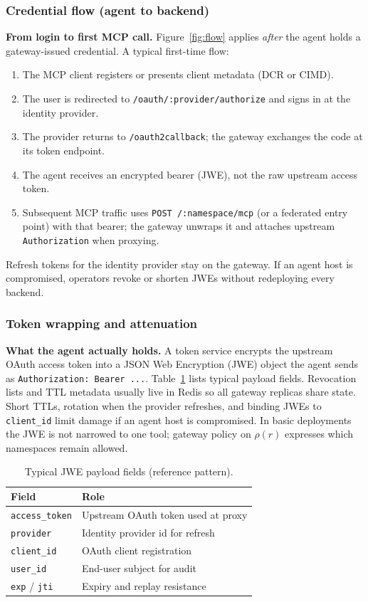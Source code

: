 \documentclass[11pt]{article}
\newcommand{\code}[1]{\texttt{#1}}
\begin{document}
\subsubsection{Credential flow (agent to backend)}

\textbf{From login to first MCP call.}
Figure~\ref{fig:flow} applies \emph{after} the agent holds a gateway-issued credential.
A typical first-time flow:
\begin{enumerate}[leftmargin=*, itemsep=0.2em]
  \item The MCP client registers or presents client metadata (DCR or CIMD).
  \item The user is redirected to \code{/oauth/:provider/authorize} and signs in at the identity provider.
  \item The provider returns to \code{/oauth2callback}; the gateway exchanges the code at its token endpoint.
  \item The agent receives an encrypted bearer (JWE), not the raw upstream access token.
  \item Subsequent MCP traffic uses \code{POST /:namespace/mcp} (or a federated entry point) with that bearer; the gateway unwraps it and attaches upstream \code{Authorization} when proxying.
\end{enumerate}
Refresh tokens for the identity provider stay on the gateway.
If an agent host is compromised, operators revoke or shorten JWEs without redeploying every backend.

\subsubsection{Token wrapping and attenuation}

\textbf{What the agent actually holds.}
A token service encrypts the upstream OAuth access token into a JSON Web Encryption (JWE) object the agent sends as \code{Authorization: Bearer ...}.
Table~\ref{tab:jwe} lists typical payload fields.
Revocation lists and TTL metadata usually live in Redis so all gateway replicas share state.
Short TTLs, rotation when the provider refreshes, and binding JWEs to \code{client\_id} limit damage if an agent host is compromised.
In basic deployments the JWE is not narrowed to one tool; gateway policy on $\rho(r)$ expresses which namespaces remain allowed.

\begin{table}[H]
\centering
\caption{Typical JWE payload fields (reference pattern).}
\label{tab:jwe}
\small
\begin{tabular}{@{}ll@{}}
\toprule
Field & Role \\
\midrule
\code{access\_token} & Upstream OAuth token used at proxy \\
\code{provider} & Identity provider id for refresh \\
\code{client\_id} & OAuth client registration \\
\code{user\_id} & End-user subject for audit \\
\code{exp} / \code{jti} & Expiry and replay resistance \\
\bottomrule
\end{tabular}
\end{table}
\end{document}
